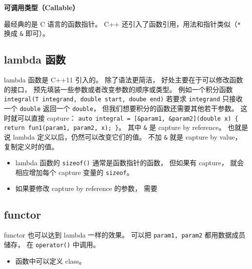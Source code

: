 

\textbf{可调用类型（Callable）}

最经典的是 C 语言的函数指针。 C++ 还引入了函数引用，用法和指针类似（\verb|*| 换成 \verb|&| 即可）。

\subsection{lambda 函数}
lambda 函数是 C++11 引入的。 除了语法更简洁， 好处主要在于可以修改函数的接口， 预先填装一些参数或者改变参数的顺序或类型。 例如一个积分函数 \verb|integral(T integrand, double start, doube end)| 若要求 \verb|integrand| 只接收一个 \verb|double| 返回一个 \verb|double|， 但我们想要积分的函数还需要其他若干参数。 这时就可以直接 capture： \verb|auto integral = [&param1, &param2](double x) { return fun1(param1, param2, x); }|。 其中 \verb|&| 是 capture by reference。 也就是说 lambda 定义以后，仍然可以改变它们的值。 不加 \verb|&| 就是 capture by value， 复制定义时的值。

\begin{itemize}
\item lambda 函数的 \verb|sizeof()| 通常是函数指针的函数， 但如果有 capture， 就会相应增加每个 capture 变量的 \verb|sizeof|。
\item 如果要修改 capture by reference 的参数， 需要
\end{itemize}

\subsection{functor}
functor 也可以达到 lambda 一样的效果。 可以把 \verb|param1, param2| 都用数据成员储存， 在 \verb|operator()| 中调用。

\begin{itemize}
\item 函数中可以定义 class。
\end{itemize}

